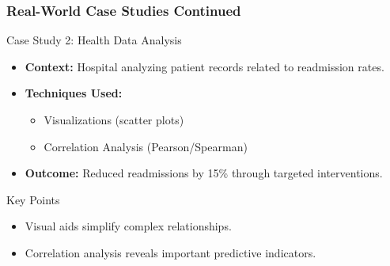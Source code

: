 \documentclass[aspectratio=169]{beamer}
\begin{document}
\begin{frame}[fragile]
    \frametitle{Real-World Case Studies Continued}
    \begin{block}{Case Study 2: Health Data Analysis}
        \begin{itemize}
            \item \textbf{Context:} Hospital analyzing patient records related to readmission rates.
            \item \textbf{Techniques Used:}
                \begin{itemize}
                    \item Visualizations (scatter plots)
                    \item Correlation Analysis (Pearson/Spearman)
                \end{itemize}
            \item \textbf{Outcome:} Reduced readmissions by 15\% through targeted interventions.
        \end{itemize}
    \end{block}

    \begin{block}{Key Points}
        \begin{itemize}
            \item Visual aids simplify complex relationships.
            \item Correlation analysis reveals important predictive indicators.
        \end{itemize}
    \end{block}
\end{frame}
\end{document}
